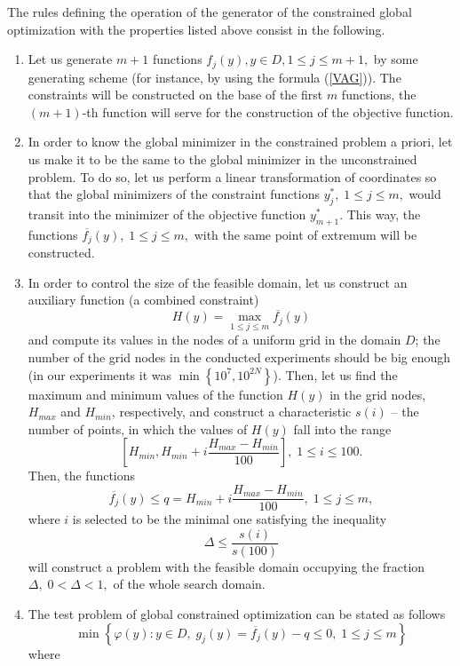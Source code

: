 \documentclass{llncs}
\begin{document}
The rules defining the operation of the generator of the constrained global optimization with the properties listed above consist in the following.

\begin{enumerate}
	\item Let us generate $m+1$ functions $f_j(y), y \in D, 1 \leq j \leq m+1,$ by some generating scheme (for instance, by using the formula (\ref{VAG})). The constraints will be constructed on the base of the first $m$ functions, the $(m+1)$-th function will serve for the construction of the objective function.
	\item In order to know the global minimizer in the constrained problem a priori, let us make it to be the same to the global minimizer in the unconstrained problem. To do so, let us perform a linear transformation of coordinates so that the global minimizers of the constraint functions $y_j^\ast, \; 1 \leq j \leq m,$ would transit into the minimizer of the objective function $y_{m+1}^\ast$. This way, the functions $\overline{f_j}(y), \; 1 \leq j \leq m,$ with the same point of extremum will be constructed.
		\item In order to control the size of the feasible domain, let us construct an auxiliary function (a combined constraint)
		\[
		H(y)=\max_{1 \leq j \leq m}{\overline{f_j}(y)}
		\]
and compute its values in the nodes of a uniform grid in the domain $D$; the number of the grid nodes in the conducted experiments should be big enough (in our experiments it was $\min \left\{10^7, 10^{2N} \right\}$). Then, let us find the maximum and minimum values of the function $H(y)$ in the grid nodes, $H_{max}$ and $H_{min}$, respectively, and construct a characteristic $s(i)$ -- the number of points, in which the values of $H(y)$ fall into the range 
\[
\left[H_{min},H_{min}+i\frac{H_{max}-H_{min}}{100}\right], \; 1 \leq i \leq 100 .
\]
Then, the functions 
\[
\overline{f_j}(y) \leq q = H_{min}+i\frac{H_{max}-H_{min}}{100}, \; 1 \leq j \leq m,
\]
where $i$ is selected to be the minimal one satisfying the inequality
\[
\Delta \leq \frac{s(i)}{s(100)}
\]
will construct a problem with the feasible domain occupying the fraction $\Delta, \; 0<\Delta<1,$ of the whole search domain.
\item 
The test problem of global constrained optimization can be stated as follows
\[
\min\left\{ \varphi(y):y \in D, \; g_j(y)= \overline{f_j}(y)-q \leq 0, \; 1 \leq j \leq m \right\}
\]
where 

\end{enumerate}
\end{document}
